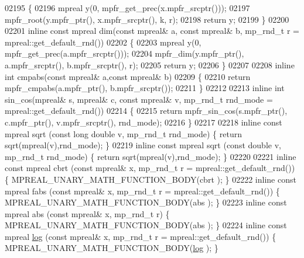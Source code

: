 \begin{DoxyCode}
{{02195 \{
02196     mpreal y(0, mpfr\_get\_prec(x.mpfr\_srcptr()));
02197     mpfr\_root(y.mpfr\_ptr(), x.mpfr\_srcptr(), k, r);
02198     \textcolor{keywordflow}{return} y;
02199 \}
02200 
02201 \textcolor{keyword}{inline} \textcolor{keyword}{const} mpreal dim(\textcolor{keyword}{const} mpreal& a, \textcolor{keyword}{const} mpreal& b, mp\_rnd\_t r = mpreal::get\_default\_rnd())
02202 \{
02203     mpreal y(0, mpfr\_get\_prec(a.mpfr\_srcptr()));
02204     mpfr\_dim(y.mpfr\_ptr(), a.mpfr\_srcptr(), b.mpfr\_srcptr(), r);
02205     \textcolor{keywordflow}{return} y;
02206 \}
02207 
02208 \textcolor{keyword}{inline} \textcolor{keywordtype}{int} cmpabs(\textcolor{keyword}{const} mpreal& a,\textcolor{keyword}{const} mpreal& b)
02209 \{
02210     \textcolor{keywordflow}{return} mpfr\_cmpabs(a.mpfr\_ptr(), b.mpfr\_srcptr());
02211 \}
02212 
02213 \textcolor{keyword}{inline} \textcolor{keywordtype}{int} sin\_cos(mpreal& s, mpreal& c, \textcolor{keyword}{const} mpreal& v, mp\_rnd\_t rnd\_mode = mpreal::get\_default\_rnd())
02214 \{
02215     \textcolor{keywordflow}{return} mpfr\_sin\_cos(s.mpfr\_ptr(), c.mpfr\_ptr(), v.mpfr\_srcptr(), rnd\_mode);
02216 \}
02217 
02218 \textcolor{keyword}{inline} \textcolor{keyword}{const} mpreal sqrt  (\textcolor{keyword}{const} \textcolor{keywordtype}{long} \textcolor{keywordtype}{double} v, mp\_rnd\_t rnd\_mode)    \{   \textcolor{keywordflow}{return} sqrt(mpreal(v),rnd\_mode); 
         \}
02219 \textcolor{keyword}{inline} \textcolor{keyword}{const} mpreal sqrt  (\textcolor{keyword}{const} \textcolor{keywordtype}{double} v, mp\_rnd\_t rnd\_mode)         \{   \textcolor{keywordflow}{return} sqrt(mpreal(v),rnd\_mode); 
         \}
02220 
02221 \textcolor{keyword}{inline} \textcolor{keyword}{const} mpreal cbrt  (\textcolor{keyword}{const} mpreal& x, mp\_rnd\_t r = mpreal::get\_default\_rnd()) \{   
      MPREAL\_UNARY\_MATH\_FUNCTION\_BODY(cbrt );    \}
02222 \textcolor{keyword}{inline} \textcolor{keyword}{const} mpreal fabs  (\textcolor{keyword}{const} mpreal& x, mp\_rnd\_t r = mpreal::get\_default\_rnd()) \{   
      MPREAL\_UNARY\_MATH\_FUNCTION\_BODY(abs  );    \}
02223 \textcolor{keyword}{inline} \textcolor{keyword}{const} mpreal abs   (\textcolor{keyword}{const} mpreal& x, mp\_rnd\_t r)                             \{   
      MPREAL\_UNARY\_MATH\_FUNCTION\_BODY(abs  );    \}
02224 \textcolor{keyword}{inline} \textcolor{keyword}{const} mpreal \hyperlink{structlog}{log}   (\textcolor{keyword}{const} mpreal& x, mp\_rnd\_t r = mpreal::get\_default\_rnd()) \{   
      MPREAL\_UNARY\_MATH\_FUNCTION\_BODY(\hyperlink{structlog}{log}  );    \}
}}
\end{DoxyCode}
